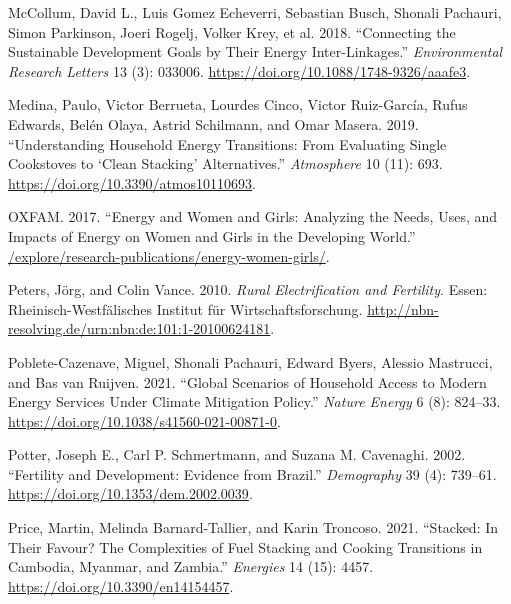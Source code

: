 \documentclass[
]{article}
\newlength{\cslhangindent}
\newlength{\cslentryspacingunit} %
\newenvironment{CSLReferences}[2] %
 {%
  \setlength{\parindent}{0pt}
  \ifodd #1
  \let\oldpar\par
  \def\par{\hangindent=\cslhangindent\oldpar}
  \fi
  \setlength{\parskip}{#2\cslentryspacingunit}
 }%
 {}
\begin{document}
\begin{CSLReferences}{1}{0}
\leavevmode{}%
McCollum, David L., Luis Gomez Echeverri, Sebastian Busch, Shonali Pachauri, Simon Parkinson, Joeri Rogelj, Volker Krey, et al. 2018. {``Connecting the Sustainable Development Goals by Their Energy Inter-Linkages.''} \emph{Environmental Research Letters} 13 (3): 033006. \url{https://doi.org/10.1088/1748-9326/aaafe3}.

\leavevmode{}%
Medina, Paulo, Victor Berrueta, Lourdes Cinco, Victor Ruiz-García, Rufus Edwards, Belén Olaya, Astrid Schilmann, and Omar Masera. 2019. {``Understanding {Household} {Energy} {Transitions}: {From} {Evaluating} {Single} {Cookstoves} to {`{Clean} {Stacking}'} {Alternatives}.''} \emph{Atmosphere} 10 (11): 693. \url{https://doi.org/10.3390/atmos10110693}.

\leavevmode{}%
OXFAM. 2017. {``Energy and {Women} and {Girls}: {Analyzing} the Needs, Uses, and Impacts of Energy on Women and Girls in the Developing World.''} \href{https:///explore/research-publications/energy-women-girls/}{/explore/research-publications/energy-women-girls/}.

\leavevmode{}%
Peters, Jörg, and Colin Vance. 2010. \emph{Rural {Electrification} and {Fertility}}. Essen: Rheinisch-Westfälisches Institut für Wirtschaftsforschung. \url{http://nbn-resolving.de/urn:nbn:de:101:1-20100624181}.

\leavevmode{}%
Poblete-Cazenave, Miguel, Shonali Pachauri, Edward Byers, Alessio Mastrucci, and Bas van Ruijven. 2021. {``Global Scenarios of Household Access to Modern Energy Services Under Climate Mitigation Policy.''} \emph{Nature Energy} 6 (8): 824--33. \url{https://doi.org/10.1038/s41560-021-00871-0}.

\leavevmode{}%
Potter, Joseph E., Carl P. Schmertmann, and Suzana M. Cavenaghi. 2002. {``Fertility and Development: Evidence from {Brazil}.''} \emph{Demography} 39 (4): 739--61. \url{https://doi.org/10.1353/dem.2002.0039}.

\leavevmode{}%
Price, Martin, Melinda Barnard-Tallier, and Karin Troncoso. 2021. {``Stacked: {In} {Their} {Favour}? {The} {Complexities} of {Fuel} {Stacking} and {Cooking} {Transitions} in {Cambodia}, {Myanmar}, and {Zambia}.''} \emph{Energies} 14 (15): 4457. \url{https://doi.org/10.3390/en14154457}.


\end{CSLReferences}
\end{document}
